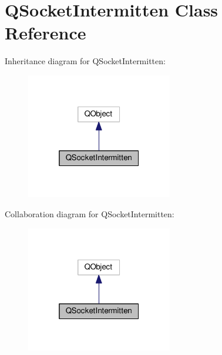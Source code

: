 \hypertarget{class_q_socket_intermitten}{}\section{Q\+Socket\+Intermitten Class Reference}
\label{class_q_socket_intermitten}


Inheritance diagram for Q\+Socket\+Intermitten\+:\nopagebreak
\begin{figure}[H]
\begin{center}
\leavevmode
\includegraphics[width=181pt]{class_q_socket_intermitten__inherit__graph}
\end{center}
\end{figure}


Collaboration diagram for Q\+Socket\+Intermitten\+:\nopagebreak
\begin{figure}[H]
\begin{center}
\leavevmode
\includegraphics[width=181pt]{class_q_socket_intermitten__coll__graph}
\end{center}
\end{figure}
